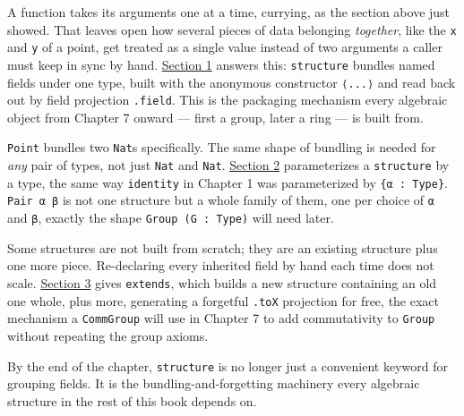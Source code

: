 A function takes its arguments one at a time, currying, as the section above just showed. That leaves open how several pieces of data belonging \emph{together}, like the \texttt{x} and \texttt{y} of a point, get treated as a single value instead of two arguments a caller must keep in sync by hand. \hyperref[sec:03-functions-and-structures:01-structure-basics:1]{Section 1} answers this: \texttt{structure} bundles named fields under one type, built with the anonymous constructor \texttt{⟨...⟩} and read back out by field projection \texttt{.field}. This is the packaging mechanism every algebraic object from Chapter 7 onward --- first a group, later a ring --- is built from.

\texttt{Point} bundles two \texttt{Nat}s specifically. The same shape of bundling is needed for \emph{any} pair of types, not just \texttt{Nat} and \texttt{Nat}. \hyperref[sec:03-functions-and-structures:02-type-parameters:1]{Section 2} parameterizes a \texttt{structure} by a type, the same way \texttt{identity} in Chapter 1 was parameterized by \texttt{\{α : Type\}}. \texttt{Pair α β} is not one structure but a whole family of them, one per choice of \texttt{α} and \texttt{β}, exactly the shape \texttt{Group (G : Type)} will need later.

Some structures are not built from scratch; they are an existing structure plus one more piece. Re-declaring every inherited field by hand each time does not scale. \hyperref[sec:03-functions-and-structures:03-extending-structures:1]{Section 3} gives \texttt{extends}, which builds a new structure containing an old one whole, plus more, generating a forgetful \texttt{.toX} projection for free, the exact mechanism a \texttt{CommGroup} will use in Chapter 7 to add commutativity to \texttt{Group} without repeating the group axioms.

By the end of the chapter, \texttt{structure} is no longer just a convenient keyword for grouping fields. It is the bundling-and-forgetting machinery every algebraic structure in the rest of this book depends on.






